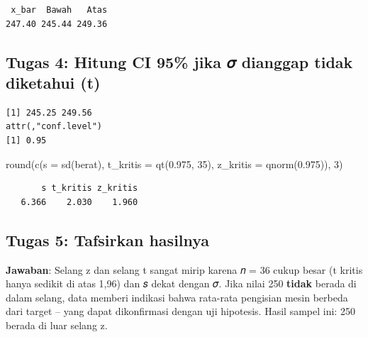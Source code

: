 \documentclass[
  indonesian,
  letterpaper,
]{book}
\newenvironment{Shaded}{\begin{snugshade}}{\end{snugshade}}
\newcommand{\AttributeTok}[1]{\textcolor[rgb]{0.40,0.45,0.13}{#1}}
\newcommand{\DecValTok}[1]{\textcolor[rgb]{0.68,0.00,0.00}{#1}}
\newcommand{\FloatTok}[1]{\textcolor[rgb]{0.68,0.00,0.00}{#1}}
\newcommand{\FunctionTok}[1]{\textcolor[rgb]{0.28,0.35,0.67}{#1}}
\newcommand{\NormalTok}[1]{\textcolor[rgb]{0.00,0.23,0.31}{#1}}
\newcommand{\SpecialCharTok}[1]{\textcolor[rgb]{0.37,0.37,0.37}{#1}}
\begin{document}
\begin{verbatim}
 x_bar  Bawah   Atas 
247.40 245.44 249.36 
\end{verbatim}

\subsection{Tugas 4: Hitung CI 95\% jika 𝜎 dianggap tidak diketahui
(t)}\label{tugas-4-hitung-ci-95-jika-ux1d70e-dianggap-tidak-diketahui-t}

\begin{Shaded}
\end{Shaded}

\begin{verbatim}
[1] 245.25 249.56
attr(,"conf.level")
[1] 0.95
\end{verbatim}

\begin{Shaded}
\begin{Highlighting}[]
\FunctionTok{round}\NormalTok{(}\FunctionTok{c}\NormalTok{(}\AttributeTok{s =} \FunctionTok{sd}\NormalTok{(berat), }\AttributeTok{t\_kritis =} \FunctionTok{qt}\NormalTok{(}\FloatTok{0.975}\NormalTok{, }\DecValTok{35}\NormalTok{), }\AttributeTok{z\_kritis =} \FunctionTok{qnorm}\NormalTok{(}\FloatTok{0.975}\NormalTok{)), }\DecValTok{3}\NormalTok{)}
\end{Highlighting}
\end{Shaded}

\begin{verbatim}
       s t_kritis z_kritis 
   6.366    2.030    1.960 
\end{verbatim}

\subsection{Tugas 5: Tafsirkan
hasilnya}\label{tugas-5-tafsirkan-hasilnya}

\textbf{Jawaban}: Selang z dan selang t sangat mirip karena 𝑛 = 36 cukup
besar (t kritis hanya sedikit di atas 1,96) dan 𝑠 dekat dengan 𝜎. Jika
nilai 250 \textbf{tidak} berada di dalam selang, data memberi indikasi
bahwa rata-rata pengisian mesin berbeda dari target -- yang dapat
dikonfirmasi dengan uji hipotesis. Hasil sampel ini: 250 berada di luar
selang z.
\end{document}
